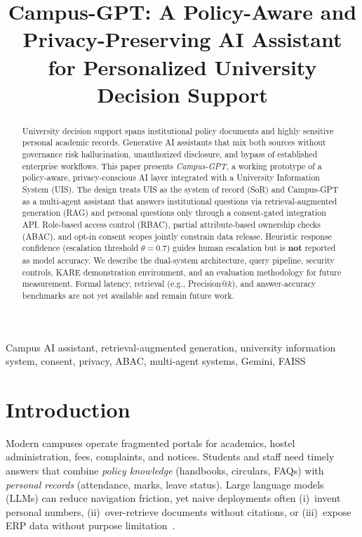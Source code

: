 \documentclass[conference]{IEEEtran}
\begin{document}
\title{Campus-GPT: A Policy-Aware and Privacy-Preserving AI Assistant for Personalized University Decision Support}

\author{
}

\maketitle

\begin{abstract}
University decision support spans institutional policy documents and highly sensitive personal academic records. Generative AI assistants that mix both sources without governance risk hallucination, unauthorized disclosure, and bypass of established enterprise workflows. This paper presents \emph{Campus-GPT}, a working prototype of a policy-aware, privacy-conscious AI layer integrated with a University Information System (UIS). The design treats UIS as the system of record (SoR) and Campus-GPT as a multi-agent assistant that answers institutional questions via retrieval-augmented generation (RAG) and personal questions only through a consent-gated integration API. Role-based access control (RBAC), partial attribute-based ownership checks (ABAC), and opt-in consent scopes jointly constrain data release. Heuristic response confidence (escalation threshold $\theta{=}0.7$) guides human escalation but is \textbf{not} reported as model accuracy. We describe the dual-system architecture, query pipeline, security controls, KARE demonstration environment, and an evaluation methodology for future measurement. Formal latency, retrieval (e.g., Precision@$k$), and answer-accuracy benchmarks are not yet available and remain future work.
\end{abstract}

\begin{IEEEkeywords}
Campus AI assistant, retrieval-augmented generation, university information system, consent, privacy, ABAC, multi-agent systems, Gemini, FAISS
\end{IEEEkeywords}

\section{Introduction}
Modern campuses operate fragmented portals for academics, hostel administration, fees, complaints, and notices. Students and staff need timely answers that combine \emph{policy knowledge} (handbooks, circulars, FAQs) with \emph{personal records} (attendance, marks, leave status). Large language models (LLMs) can reduce navigation friction, yet naive deployments often (i)~invent personal numbers, (ii)~over-retrieve documents without citations, or (iii)~expose ERP data without purpose limitation~\cite{lewis2020rag,kasneci2023chatgpt}.
\end{document}
